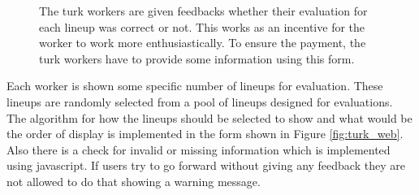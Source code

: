 \documentclass[11pt]{article}
\begin{document}
\begin{figure}[hbtp]
   \centering
       \caption{The turk workers are given feedbacks whether their evaluation for each lineup was correct or not. This works as an incentive for the worker to work more enthusiastically. To ensure the payment, the turk workers have to provide some information using this form.}
       \label{fig:turk_web_feedback}
\end{figure}

Each worker is shown some specific number of lineups for evaluation. These lineups are randomly selected from a pool of lineups designed for evaluations. The algorithm for how the lineups should be selected to show and what would be the order of display is implemented in the form shown in Figure \ref{fig:turk_web}. Also there is a check for invalid or missing information which is implemented using javascript. If users try to go forward without giving any feedback they are not allowed to do that showing a warning message.

\end{document}

